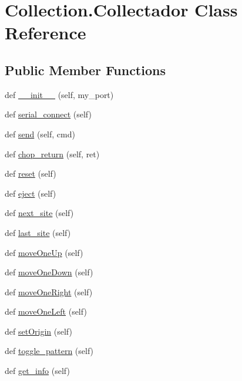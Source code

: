 \hypertarget{class_collection_1_1_collectador}{}\section{Collection.\+Collectador Class Reference}
\label{class_collection_1_1_collectador}
\subsection*{Public Member Functions}
\begin{DoxyCompactItemize}
\item 
def \mbox{\hyperlink{class_collection_1_1_collectador_af9b0ad6313049442cdc6e924a017693e}{\+\_\+\+\_\+init\+\_\+\+\_\+}} (self, my\+\_\+port)
\item 
def \mbox{\hyperlink{class_collection_1_1_collectador_a3d72795fd989947bee15cdd66f277815}{serial\+\_\+connect}} (self)
\item 
def \mbox{\hyperlink{class_collection_1_1_collectador_a06c63ef23395dbbc8975e407500ed593}{send}} (self, cmd)
\item 
def \mbox{\hyperlink{class_collection_1_1_collectador_a1fcc60319735e3e18d938c84073aef20}{chop\+\_\+return}} (self, ret)
\item 
def \mbox{\hyperlink{class_collection_1_1_collectador_ada8c768e4da16031fe01afcef78957e1}{reset}} (self)
\item 
def \mbox{\hyperlink{class_collection_1_1_collectador_a4e3a010e6084283e311c019de7f7cc5b}{eject}} (self)
\item 
def \mbox{\hyperlink{class_collection_1_1_collectador_aa156ce605af4adfec1bfb7aa8447eb65}{next\+\_\+site}} (self)
\item 
def \mbox{\hyperlink{class_collection_1_1_collectador_a784d44c359c9a4109ccd62b52a9a1e05}{last\+\_\+site}} (self)
\item 
def \mbox{\hyperlink{class_collection_1_1_collectador_adab834abec1ab30ea7041d4f3637a7f7}{move\+One\+Up}} (self)
\item 
def \mbox{\hyperlink{class_collection_1_1_collectador_a2a68201ca55e22ec63e306da0aaeec39}{move\+One\+Down}} (self)
\item 
def \mbox{\hyperlink{class_collection_1_1_collectador_a14b9821e1685764187122c92b6079adb}{move\+One\+Right}} (self)
\item 
def \mbox{\hyperlink{class_collection_1_1_collectador_a129fbb777f2556972e92f4858b44fb16}{move\+One\+Left}} (self)
\item 
def \mbox{\hyperlink{class_collection_1_1_collectador_a062823e41a786cd0f1577b02bf14ed67}{set\+Origin}} (self)
\item 
def \mbox{\hyperlink{class_collection_1_1_collectador_afe1f8b5d2328cf6ea624682ea716401a}{toggle\+\_\+pattern}} (self)
\item 
def \mbox{\hyperlink{class_collection_1_1_collectador_a23757363741c6dd611d91dd984013d86}{get\+\_\+info}} (self)
\end{DoxyCompactItemize}
